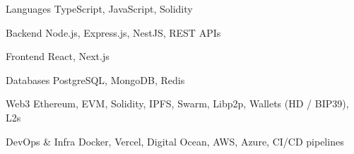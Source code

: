 
\begin{cvskills}

\cvskill
{Languages}
{TypeScript, JavaScript, Solidity}

\cvskill
{Backend}
{Node.js, Express.js, NestJS, REST APIs}

\cvskill
{Frontend}
{React, Next.js}

\cvskill
{Databases}
{PostgreSQL, MongoDB, Redis}

\cvskill
{Web3}
{Ethereum, EVM, Solidity, IPFS, Swarm, Libp2p, Wallets (HD / BIP39), L2s}

\cvskill
{DevOps \& Infra}
{Docker, Vercel, Digital Ocean, AWS, Azure, CI/CD pipelines}



\end{cvskills}
